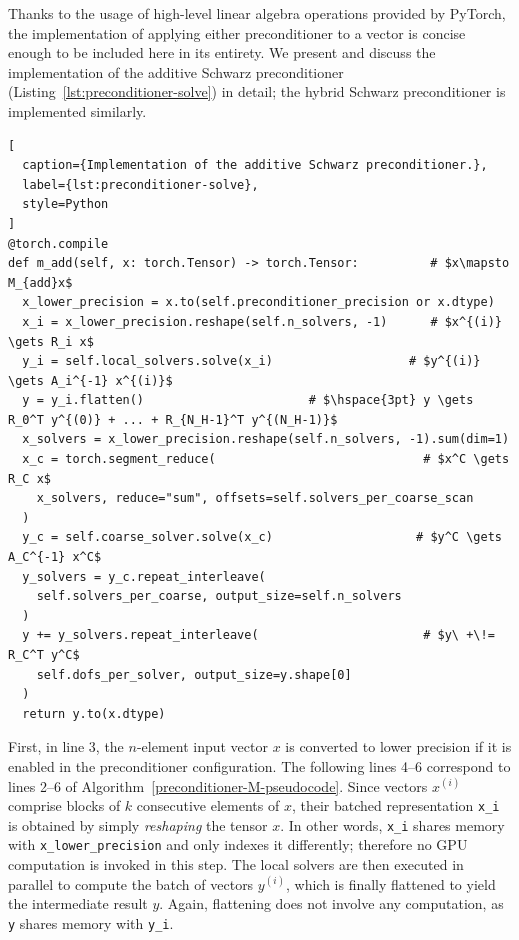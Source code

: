 \documentclass[11pt]{article}
\theoremstyle{definition}
\theoremstyle{theorem}
\begin{document}
Thanks to the usage of high-level linear algebra operations provided by PyTorch,
the implementation of applying either preconditioner to a vector is concise enough
to be included here in its entirety. We present and discuss the implementation
of the additive Schwarz preconditioner (Listing~\ref{lst:preconditioner-solve}) in detail;
the hybrid Schwarz preconditioner is implemented similarly.

\begin{algorithm}
\vspace{-3pt}
\begin{lstlisting}[
  caption={Implementation of the additive Schwarz preconditioner.},
  label={lst:preconditioner-solve},
  style=Python
]
@torch.compile
def m_add(self, x: torch.Tensor) -> torch.Tensor:          # $x\mapsto M_{add}x$
  x_lower_precision = x.to(self.preconditioner_precision or x.dtype)
  x_i = x_lower_precision.reshape(self.n_solvers, -1)      # $x^{(i)} \gets R_i x$
  y_i = self.local_solvers.solve(x_i)                   # $y^{(i)} \gets A_i^{-1} x^{(i)}$
  y = y_i.flatten()                       # $\hspace{3pt} y \gets R_0^T y^{(0)} + ... + R_{N_H-1}^T y^{(N_H-1)}$
  x_solvers = x_lower_precision.reshape(self.n_solvers, -1).sum(dim=1)
  x_c = torch.segment_reduce(                             # $x^C \gets R_C x$
    x_solvers, reduce="sum", offsets=self.solvers_per_coarse_scan
  )
  y_c = self.coarse_solver.solve(x_c)                    # $y^C \gets A_C^{-1} x^C$
  y_solvers = y_c.repeat_interleave(
    self.solvers_per_coarse, output_size=self.n_solvers
  )
  y += y_solvers.repeat_interleave(                       # $y\ +\!= R_C^T y^C$
    self.dofs_per_solver, output_size=y.shape[0]
  )
  return y.to(x.dtype)
\end{lstlisting}
\vspace{-3pt}
\end{algorithm}

First, in line 3,
the $n$-element input vector $x$ is converted to lower precision if it is enabled
in the preconditioner configuration. The following lines 4--6 correspond to
lines 2--6 of Algorithm~\ref{preconditioner-M-pseudocode}. Since
vectors $x^{(i)}$ comprise blocks of $k$ consecutive elements of $x$, their
batched representation \verb|x_i| is obtained by simply \emph{reshaping}
the tensor $x$. In other words, \verb|x_i| shares memory with \verb|x_lower_precision|
and only indexes it differently; therefore no GPU computation is invoked in this step.
The local solvers are then executed in parallel to compute the batch of
vectors $y^{(i)}$, which is finally flattened to yield the intermediate result $y$.
Again, flattening does not involve any computation, as \verb|y| shares memory with \verb|y_i|.
\end{document}
